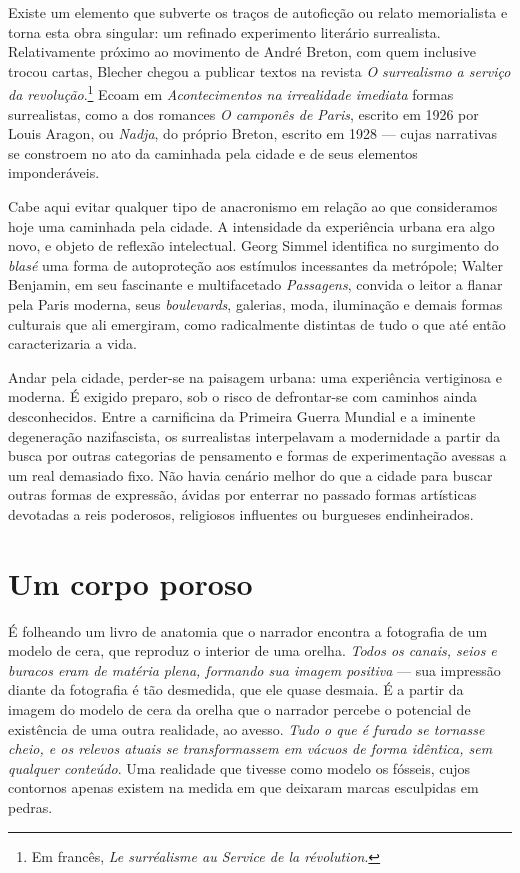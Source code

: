 Existe um elemento que subverte os traços de autoficção ou relato memorialista e torna esta obra singular: um refinado experimento literário surrealista. Relativamente próximo ao movimento de André Breton, com quem inclusive trocou cartas, Blecher chegou a publicar textos na revista \textit{O surrealismo a serviço da revolução}.\footnote{Em francês, \textit{Le surréalisme au Service de la révolution}.} Ecoam em \textit{Acontecimentos na irrealidade imediata} formas surrealistas, como a dos romances \textit{O camponês de Paris}, escrito em 1926 por Louis Aragon, ou \textit{Nadja}, do próprio Breton, escrito em 1928 --- cujas narrativas se constroem no ato da caminhada pela cidade e de seus elementos imponderáveis.

Cabe aqui evitar qualquer tipo de anacronismo em relação ao que consideramos hoje uma caminhada pela cidade. A intensidade da experiência urbana era algo novo, e objeto de reflexão intelectual. Georg Simmel identifica no surgimento do \textit{blasé} uma forma de autoproteção aos estímulos incessantes da metrópole; Walter Benjamin, em seu fascinante e multifacetado \textit{Passagens}, convida o leitor a flanar pela Paris moderna, seus \textit{boulevards}, galerias, moda, iluminação e demais formas culturais que ali emergiram, como radicalmente distintas de tudo o que até então caracterizaria a vida.

Andar pela cidade, perder-se na paisagem urbana: uma experiência vertiginosa e moderna. É exigido preparo, sob o risco de defrontar-se com caminhos ainda desconhecidos. Entre a carnificina da Primeira Guerra Mundial e a iminente degeneração nazifascista, os surrealistas interpelavam a modernidade a partir da busca por outras categorias de pensamento e formas de experimentação avessas a um real demasiado fixo. Não havia cenário melhor do que a cidade para buscar outras formas de expressão, ávidas por enterrar no passado formas artísticas devotadas a reis poderosos, religiosos influentes ou burgueses endinheirados.

\section{Um corpo poroso}

É folheando um livro de anatomia que o narrador encontra a fotografia de um modelo de cera, que reproduz o interior de uma orelha. \textit{Todos os canais, seios e buracos eram de matéria plena, formando sua imagem positiva} --- sua impressão diante da fotografia é tão desmedida, que ele quase desmaia. É a partir da imagem do modelo de cera da orelha que o narrador percebe o potencial de existência de uma outra realidade, ao avesso. \textit{Tudo o que é furado se tornasse cheio, e os relevos atuais se transformassem em vácuos de forma idêntica, sem qualquer conteúdo}. Uma realidade que tivesse como modelo os fósseis, cujos contornos apenas existem na medida em que deixaram marcas esculpidas em pedras.


